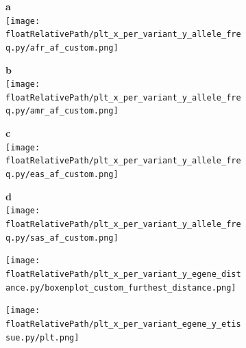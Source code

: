%
%

\begin{figure}[!tbp]

    \begin{subfigure}[]{.49\textwidth}
        \textbf{a}
        \\
        \texttt{[image: \\floatRelativePath/plt\_x\_per\_variant\_y\_allele\_freq.py/afr\_af\_custom.png]}
    \end{subfigure}
%
    \begin{subfigure}[]{.49\textwidth}
        \textbf{b}
        \\
        \texttt{[image: \\floatRelativePath/plt\_x\_per\_variant\_y\_allele\_freq.py/amr\_af\_custom.png]}
    \end{subfigure}

    \begin{subfigure}[]{.49\textwidth}
        \textbf{c}
        \\
        \texttt{[image: \\floatRelativePath/plt\_x\_per\_variant\_y\_allele\_freq.py/eas\_af\_custom.png]}
    \end{subfigure}
%
    \centering
    \begin{subfigure}[]{.49\textwidth}
        \textbf{d}
        \\
        \texttt{[image: \\floatRelativePath/plt\_x\_per\_variant\_y\_allele\_freq.py/sas\_af\_custom.png]}
    \end{subfigure}

    \caption{}

\end{figure}


\begin{figure}[!ht]
    \centering
    \begin{subfigure}[]{.49\textwidth}
        \texttt{[image: \\floatRelativePath/plt\_x\_per\_variant\_y\_egene\_distance.py/boxenplot\_custom\_furthest\_distance.png]}
    \end{subfigure}

    \caption{}

\end{figure}


\begin{figure}[!ht]
    \centering
    \begin{subfigure}[]{.49\textwidth}
        \texttt{[image: \\floatRelativePath/plt\_x\_per\_variant\_egene\_y\_etissue.py/plt.png]}
    \end{subfigure}

    \caption{}

\end{figure}




